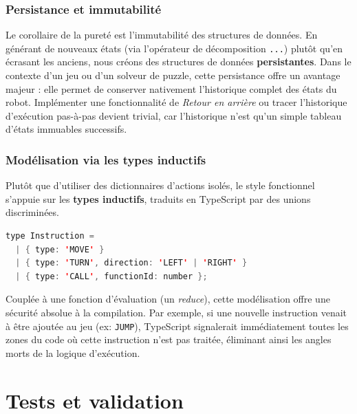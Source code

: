 \documentclass[12pt,a4paper]{article}
\begin{document}
\subsubsection*{Persistance et immutabilité}
Le corollaire de la pureté est l'immutabilité des structures de données. 
En générant de nouveaux états (via l'opérateur de décomposition \texttt{...}) plutôt qu'en écrasant les anciens, 
nous créons des structures de données \textbf{persistantes}. 
Dans le contexte d'un jeu ou d'un solveur de puzzle, cette persistance offre un avantage majeur : 
elle permet de conserver nativement l'historique complet des états du robot. 
Implémenter une fonctionnalité de \textit{Retour en arrière} ou tracer l'historique d'exécution pas-à-pas devient trivial, 
car l'historique n'est qu'un simple tableau d'états immuables successifs.

\subsubsection*{Modélisation via les types inductifs}
Plutôt que d'utiliser des dictionnaires d'actions isolés, le style fonctionnel s'appuie sur les \textbf{types inductifs}, 
traduits en TypeScript par des unions discriminées. 

\begin{lstlisting}[language=Java, basicstyle=\ttfamily\small, frame=single, title={Modélisation par types inductifs}]
type Instruction = 
  | { type: 'MOVE' }
  | { type: 'TURN', direction: 'LEFT' | 'RIGHT' }
  | { type: 'CALL', functionId: number };
\end{lstlisting}

Couplée à une fonction d'évaluation (un \textit{reduce}), 
cette modélisation offre une sécurité absolue à la compilation. 
Par exemple, si une nouvelle instruction venait à être ajoutée au jeu (ex: \texttt{JUMP}), 
TypeScript signalerait immédiatement toutes les zones du code où cette instruction n'est pas traitée, 
éliminant ainsi les angles morts de la logique d'exécution.



\section{Tests et validation}
\label{sec:tests}
\end{document}
